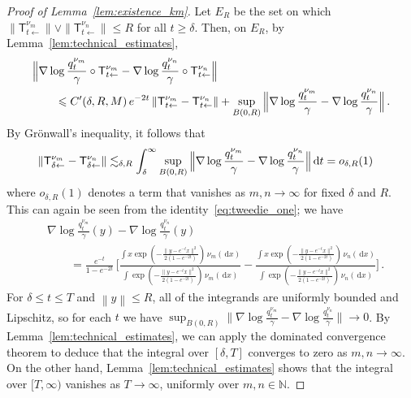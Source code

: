 \documentclass[12pt]{article}
\newcommand{\N}{\mathbb{N}}
\newcommand{\1}{\mathds{1}}
\newcommand*{\rd}{\mathrm{d}}
\newcommand*{\dd}{\, \rd}
\newcommand*{\norm}[1]{\left\|#1\right\|}
\renewcommand{\ge}{\geqslant}
\renewcommand{\le}{\leqslant}
\theoremstyle{plain}
\theoremstyle{definition}
\theoremstyle{remark}
\begin{document}
\begin{proof}[Proof of Lemma~\ref{lem:existence_km}]
    Let $E_R$ be the set on which $\|\mathsf T_{t\gets}^{\nu_m}\| \vee \|\mathsf T_{t\gets}^{\nu_n}\| \le R$ for all $t \ge \delta$.
    Then, on $E_R$, by Lemma~\ref{lem:technical_estimates},
    \begin{align*}
        &\Bigl\lVert \nabla \log \frac{q_t^{\nu_m}}{\gamma} \circ \mathsf T^{\nu_m}_{t\gets} - \nabla \log \frac{q_t^{\nu_n}}{\gamma} \circ \mathsf T^{\nu_n}_{t\gets}\Bigr\rVert \\
        &\qquad \le C'(\delta,R,M)\,e^{-2t}\,\|\mathsf T_{t\gets}^{\nu_m} - \mathsf T_{t\gets}^{\nu_n}\| + \sup_{B(0,R)}{\Bigl\lVert\nabla \log \frac{q_t^{\nu_m}}{\gamma} - \nabla \log \frac{q_t^{\nu_n}}{\gamma} \Bigr\rVert}\,.
    \end{align*}
    By Gr\"{o}nwall's inequality, it follows that
    \begin{align*}
        \|\mathsf T^{\nu_{m}}_{\delta\gets} - \mathsf T^{\nu_{n}}_{\delta\gets}\|
        &\lesssim_{\delta,R} \int_\delta^\infty\sup_{B(0,R)}{\Bigl\lVert\nabla \log \frac{q_t^{\nu_m}}{\gamma} - \nabla \log \frac{q_t^{\nu_n}}{\gamma} \Bigr\rVert}\dd t
        = o_{\delta,R}(1)
    \end{align*}
    where $o_{\delta,R}(1)$ denotes a term that vanishes as $m,n\to\infty$ for fixed $\delta$ and $R$.
    This can again be seen from the identity~\eqref{eq:tweedie_one}; we have
    \begin{align*}
        &\nabla \log \frac{q_t^{\nu_m}}{\gamma}(y) - \nabla \log \frac{q_t^{\nu_n}}{\gamma}(y) \\
        &\qquad = \frac{e^{-t}}{1-e^{-2t}}\,\biggl[\frac{\int x \exp(-\frac{\|y-e^{-t} x\|^2}{2(1-e^{-2t})})\,\nu_m(\!\dd x)}{\int \exp(-\frac{\|y-e^{-t} x\|^2}{2(1-e^{-2t})})\,\nu_m(\!\dd x)} - \frac{\int x \exp(-\frac{\|y-e^{-t} x\|^2}{2(1-e^{-2t})})\,\nu_n(\!\dd x)}{\int \exp(-\frac{\|y-e^{-t} x\|^2}{2(1-e^{-2t})})\,\nu_n(\!\dd x)}\biggr]\,.
    \end{align*}
    For $\delta \le t \le T$ and $\norm y \le R$, all of the integrands are uniformly bounded and Lipschitz, so for each $t$ we have $\sup_{B(0,R)}{\bigl\lVert\nabla \log \frac{q_t^{\nu_m}}{\gamma} - \nabla \log \frac{q_t^{\nu_n}}{\gamma} \bigr\rVert} \to 0$.
    By Lemma~\ref{lem:technical_estimates}, we can apply the dominated convergence theorem to deduce that the integral over $[\delta,T]$ converges to zero as $m,n\to\infty$.
    On the other hand, Lemma~\ref{lem:technical_estimates} shows that the integral over $[T,\infty)$ vanishes as $T\to\infty$, uniformly over $m,n\in\N$.


\end{proof}
\end{document}

